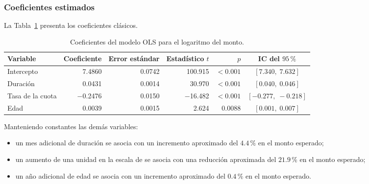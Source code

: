 \subsubsection{Coeficientes estimados}

La Tabla~\ref{tab:coeficientes-ols} presenta los coeficientes clásicos.

\begin{table}[H]
    \centering
    \caption{Coeficientes del modelo OLS para el logaritmo del monto.}
    \label{tab:coeficientes-ols}

    \begin{tabular}{
        @{}
        l
        r
        r
        r
        r
        c
        @{}
    }
        \toprule
        Variable
        & Coeficiente
        & Error estándar
        & Estadístico \(t\)
        & \(p\)
        & IC del \(95\,\%\) \\
        \midrule

        Intercepto
        & \num{7.4860}
        & \num{0.0742}
        & \num{100.915}
        & \(<0.001\)
        & \([7.340,\;7.632]\) \\

        Duración
        & \num{0.0431}
        & \num{0.0014}
        & \num{30.970}
        & \(<0.001\)
        & \([0.040,\;0.046]\) \\

        Tasa de la cuota
        & \num{-0.2476}
        & \num{0.0150}
        & \num{-16.482}
        & \(<0.001\)
        & \([-0.277,\;-0.218]\) \\

        Edad
        & \num{0.0039}
        & \num{0.0015}
        & \num{2.624}
        & \num{0.0088}
        & \([0.001,\;0.007]\) \\

        \bottomrule
    \end{tabular}
\end{table}

Manteniendo constantes las demás variables:

\begin{itemize}
    \item un mes adicional de duración se asocia con un incremento
    aproximado del \(4.4\,\%\) en el monto esperado;

    \item un aumento de una unidad en la escala de
     se asocia con una reducción aproximada del
    \(21.9\,\%\) en el monto esperado;

    \item un año adicional de edad se asocia con un incremento
    aproximado del \(0.4\,\%\) en el monto esperado.
\end{itemize}

